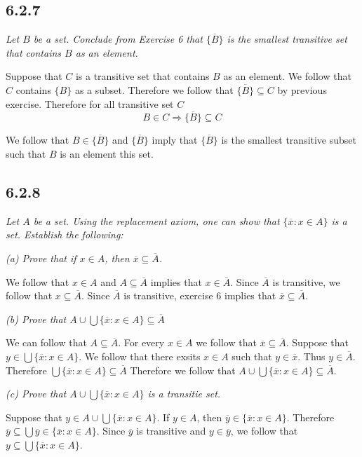 \documentclass[11pt,oneside,titlepage]{book}
\DeclareMathOperator \ra {\Rightarrow}
\begin{document}
\subsection*{6.2.7}

\textit{Let $B$ be a set. Conclude from Exercise 6 that $\overline{\{B\}}$ is the
  smallest transitive set that contains $B$ as an element.}

Suppose that $C$ is a transitive set that contains $B$ as an element. We follow that
$C$ contains $\{B\}$ as a subset. Therefore we follow that $\overline{\{B\}} \subseteq C$
by previous exercise. Therefore for all
transitive set $C$
$$B \in C \ra \overline{\{B\}} \subseteq C$$

We follow that  $B \in \overline{\{B\}}$ and $\overline{\{B\}}$ imply that
$\overline{\{B\}}$ is the smallest transitive subset such that $B$ is an element this set.

\subsection*{6.2.8}

\textit{Let $A$ be a set. Using the replacement axiom, one can show that
  $\{\overline{x}: x \in A\}$ is a set. Establish the following:}

\textit{(a) Prove that if $x \in A$, then $\overline{x} \subseteq \overline{A}$.}

We follow that $x \in A$ and $A \subseteq \overline{A}$ implies that
$x \in \overline{A}$. Since $\overline{A}$ is transitive, we follow that
$x \subseteq \overline{A}$. Since $\overline{A}$ is transitive, exercise 6 implies that
$\overline{x} \subseteq \overline{A}$.

\textit{(b) Prove that $A \cup \bigcup{\{\overline{x}: x \in A\}} \subseteq \overline{A}$}

We can follow that $A \subseteq \overline{A}$. For every $x \in A$ we follow that
$\overline{x} \subseteq \overline{A}$. Suppose that $y \in \bigcup{\{\overline{x}: x \in A\}}$.
We follow that there exsits $x \in A$ such that $y \in \overline{x}$. Thus
$y \in \overline{A}$. Therefore $\bigcup{\{\overline{x}: x \in A\}} \subseteq \overline{A}$
Therefore we follow that $A \cup \bigcup{\{\overline{x}: x \in A\}} \subseteq \overline{A}$.

\textit{(c) Prove that $A \cup \bigcup{\{\overline{x}: x \in A\}}$ is a transitie set.}

Suppose that $y \in A \cup \bigcup{\{\overline{x}: x \in A\}}$.
If $y \in A$, then $\overline{y} \in \{\overline{x}: x \in A\}$. Therefore
$\overline{y} \subseteq \bigcup{\overline{y} \in \{\overline{x}: x \in A\}}$.
Since $\overline{y}$ is transitive and $y \in \overline{y}$, we follow that
$y \subseteq \bigcup{\{\overline{x}: x \in A\}}$.
\end{document}
